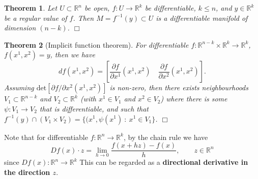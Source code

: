 \documentclass[letter-paper]{tufte-book}
\newtheorem{theorem}{\color{pastel-blue}Theorem}[section]
\newcommand{\qedwhite}{\hfill \ensuremath{\Box}}
\begin{document}
\begin{theorem}
  Let $U \subset \mathbb{R}^n$ be open, $f : U \to \mathbb{R}^k$ be differentiable, $k \leq n$, and $y \in \mathbb{R}^k$ be a regular value of $f$. Then $M = f^{-1}(y) \subset U$ is a differentiable manifold of dimension $(n-k)$. \qedwhite
\end{theorem}

\begin{theorem}[Implicit function theorem]
  For differentiable $f : \mathbb{R}^{n-k} \times \mathbb{R}^k \to \mathbb{R}^k$, $f(x^1, x^2) = y$, then we have
  \begin{equation*}
    df(x^1, x^2) = \left[\frac{\partial f}{\partial x^1}(x^1, x^2) \quad \frac{\partial f}{\partial x^2}(x^1, x^2)\right].
  \end{equation*}
  Assuming $\mbox{det}\left[\partial f / \partial x^2(x^1, x^2)\right]$ is non-zero, then there exists neighbourhoods $V_1 \subset \mathbb{R}^{n-k}$ and $V_2 \subset \mathbb{R}^k$ (with $x^1 \in V_1$ and $x^2 \in V_2$) where there is some $\psi : V_1 \to V_2$ that is differentiable, and such that $f^{-1}(y) \cap (V_1 \times V_2) = \{(x^1, \psi(x^1)\ :\ x^1 \in V_1\}$. \qedwhite
\end{theorem}

Note that for differentiable $f : \mathbb{R}^n \to \mathbb{R}^k$, by the chain rule we have
\begin{equation}
  Df(x) \cdot z = \lim_{h \to 0} \frac{f(x + hz) - f(x)}{h}, \qquad z \in \mathbb{R}^n
\end{equation}
since $Df(x) : \mathbb{R}^n \to \mathbb{R}^k$ This can be regarded as a \textbf{directional derivative in the direction $z$}.
\end{document}
